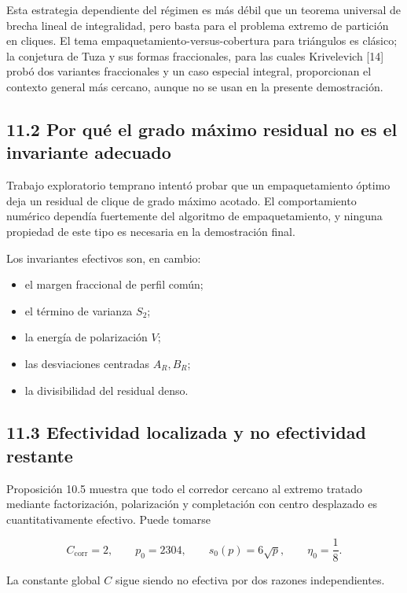 \documentclass[
  11pt,
]{article}
\providecommand{\tightlist}{%
  \setlength{\itemsep}{0pt}\setlength{\parskip}{0pt}}
\begin{document}
Esta estrategia dependiente del régimen es más débil que un teorema universal de brecha lineal de integralidad, pero basta para el problema extremo de partición en cliques. El tema empaquetamiento-versus-cobertura para triángulos es clásico; la conjetura de Tuza y sus formas fraccionales, para las cuales Krivelevich {[}14{]} probó dos variantes fraccionales y un caso especial integral, proporcionan el contexto general más cercano, aunque no se usan en la presente demostración.

\subsection{11.2 Por qué el grado máximo residual no es el invariante adecuado}\label{por-quuxe9-el-grado-muxe1ximo-residual-no-es-el-invariante-adecuado}

Trabajo exploratorio temprano intentó probar que un empaquetamiento óptimo deja un residual de clique de grado máximo acotado. El comportamiento numérico dependía fuertemente del algoritmo de empaquetamiento, y ninguna propiedad de este tipo es necesaria en la demostración final.

Los invariantes efectivos son, en cambio:

\begin{itemize}
\tightlist
\item
  el margen fraccional de perfil común;
\item
  el término de varianza \(S_2\);
\item
  la energía de polarización \(V\);
\item
  las desviaciones centradas \(A_R,B_R\);
\item
  la divisibilidad del residual denso.
\end{itemize}

\subsection{11.3 Efectividad localizada y no efectividad restante}\label{efectividad-localizada-y-no-efectividad-restante}

Proposición 10.5 muestra que todo el corredor cercano al extremo tratado mediante factorización, polarización y completación con centro desplazado es cuantitativamente efectivo. Puede tomarse

\[
C_{\mathrm{corr}}=2,
\qquad
p_0=2304,
\qquad
s_0(p)=6\sqrt p,
\qquad
\eta_0=\frac18.
\]

La constante global \(C\) sigue siendo no efectiva por dos razones independientes.
\end{document}
